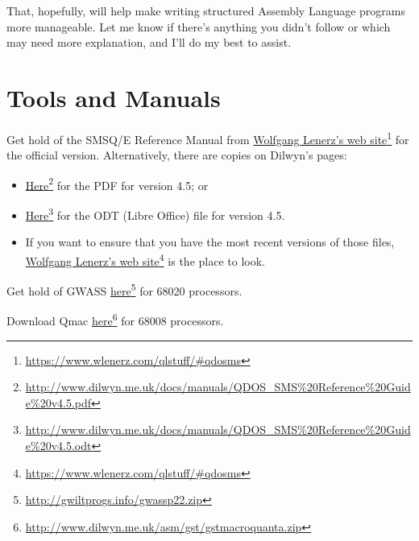 That, hopefully, will help make writing structured Assembly Language
programs more manageable. Let me know if there's anything you didn't
follow or which may need more explanation, and I'll do my best to
assist.

\section{Tools and Manuals\label{sec:Tools-and-Manuals}}

Get hold of the SMSQ/E Reference Manual from \href{https://www.wlenerz.com/qlstuff/\#qdosms}{Wolfgang Lenerz's web site}\footnote{\url{https://www.wlenerz.com/qlstuff/\#qdosms}}
for the official version. Alternatively, there are copies on Dilwyn's
pages:
\begin{itemize}
\item \href{http://www.dilwyn.me.uk/docs/manuals/QDOS_SMS\%20Reference\%20Guide\%20v4.5.pdf}{Here}\footnote{\url{http://www.dilwyn.me.uk/docs/manuals/QDOS\_SMS\%20Reference\%20Guide\%20v4.5.pdf}}
for the PDF for version 4.5; or

\item \href{http://www.dilwyn.me.uk/docs/manuals/QDOS_SMS\%20Reference\%20Guide\%20v4.5.odt}{Here}\footnote{\url{http://www.dilwyn.me.uk/docs/manuals/QDOS\_SMS\%20Reference\%20Guide\%20v4.5.odt}}
for the ODT (Libre Office) file for version 4.5.

\item If you want to ensure that you have the most recent versions of those
files, \href{https://www.wlenerz.com/qlstuff/\#qdosms}{Wolfgang Lenerz's web site}\footnote{\url{https://www.wlenerz.com/qlstuff/\#qdosms}}
is the place to look.
\end{itemize}

Get hold of GWASS \href{http://gwiltprogs.info/gwassp22.zip}{here}\footnote{\url{http://gwiltprogs.info/gwassp22.zip}}
for 68020 processors.

Download Qmac \href{http://www.dilwyn.me.uk/asm/gst/gstmacroquanta.zip}{here}\footnote{\url{http://www.dilwyn.me.uk/asm/gst/gstmacroquanta.zip}}
for 68008 processors.
